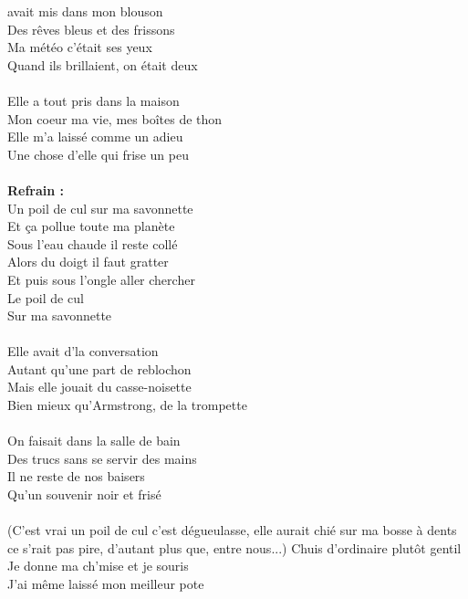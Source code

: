 
 avait mis dans mon blouson
\\Des rêves bleus et des frissons
\\Ma météo c'était ses yeux
\\Quand ils brillaient, on était deux
\\\\Elle a tout pris dans la maison
\\Mon coeur ma vie, mes boîtes de thon
\\Elle m'a laissé comme un adieu
\\Une chose d'elle qui frise un peu
\\\\\textbf{Refrain :}
\\Un poil de cul sur ma savonnette
\\Et ça pollue toute ma planète
\\Sous l'eau chaude il reste collé 
\\Alors du doigt il faut gratter
\\Et puis sous l'ongle aller chercher
\\Le poil de cul 
\\Sur ma savonnette
\\\\Elle avait d'la conversation
\\Autant qu'une part de reblochon
\\Mais elle jouait du casse-noisette
\\Bien mieux qu'Armstrong, de la trompette
\\\\On faisait dans la salle de bain
\\Des trucs sans se servir des mains
\\Il ne reste de nos baisers
\\Qu'un souvenir noir et frisé
\\\\(C'est vrai un poil de cul c'est dégueulasse, elle aurait chié sur ma
bosse à dents ce s'rait pas pire, d'autant plus que, entre nous...)
\breakpage
Chuis d'ordinaire plutôt gentil
\\Je donne ma ch'mise et je souris
\\J'ai même laissé mon meilleur pote
